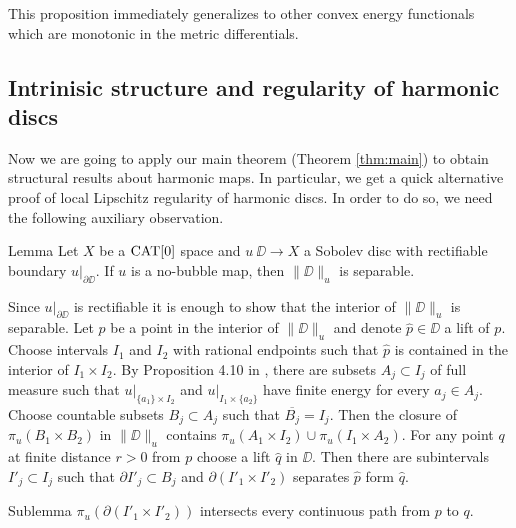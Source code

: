 \documentclass[a4paper,10pt]{amsart}
\begin{document}
 
This proposition immediately generalizes to other convex energy functionals which are monotonic in the metric differentials.
 
 
 
 
 
 
 
 
 
 
 
 
 
 



\subsection{Intrinisic structure and regularity of harmonic discs}                                                      			

Now we are going to apply our main theorem (Theorem \ref{thm:main}) to obtain structural results about harmonic maps. In particular,
we get a quick alternative proof of local Lipschitz regularity of harmonic discs.
In order to do so, we need the following auxiliary observation.

\begin{thm}{Lemma}\label{lem:separable}
Let $X$ be a $\mathop{\rm CAT}\nolimits[0]$ space 
and $u\:\DD\to X$ a Sobolev disc with rectifiable boundary $u|_{\partial \DD}$.
If $u$ is a no-bubble map, then $\|\DD\|_u$ is separable.
\end{thm}

Since $u|_{\partial \DD}$ is rectifiable it is enough to show that 
the interior of $\|\DD\|_u$ is separable. Let $p$ be a point in the interior of $\|\DD\|_u$ and denote $\hat p\in\DD$ 
a lift of $p$. Choose intervals $I_1$ and $I_2$ with rational endpoints such that $\hat p$ is contained in the interior of $I_1\times I_2$.
By Proposition 4.10 in \cite{LW}, there are subsets $A_j\subset I_j$ of full measure such that $u|_{\{a_1\}\times I_2}$
and $u|_{I_1\times \{a_2\}}$ have finite energy for every $a_j\in A_j$. Choose countable subsets $B_j\subset A_j$
such that $\overline{B_j}=I_j$. Then the closure of $\pi_u(B_1\times B_2)$ in $\|\DD\|_u$ contains 
$\pi_u(A_1\times I_2)\cup \pi_u(I_1\times A_2)$.
For any point $q$ at finite distance $r>0$ from $p$ choose a lift $\hat q$ in $\DD$. Then there are subintervals $I'_j\subset I_j$
such that $\partial I'_j\subset B_j$ and $\partial( I'_1\times I'_2)$ separates $\hat p$ form $\hat q$.
\begin{thm}{Sublemma}\label{sublem:separating}
$\pi_u(\partial( I'_1\times I'_2))$ intersects every continuous path from $p$ to $q$.
\end{thm}
\end{document}
